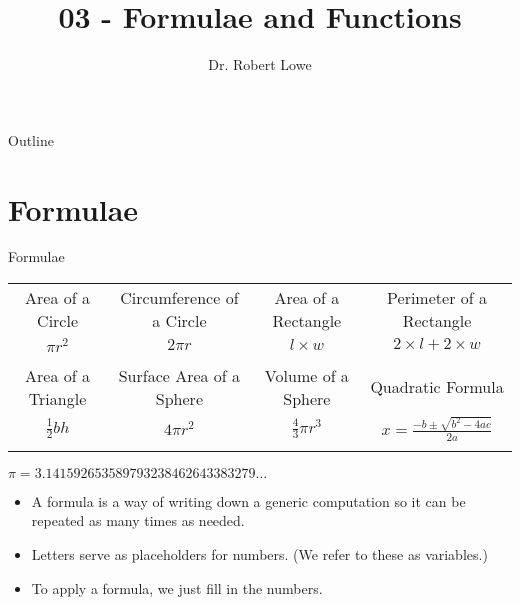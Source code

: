 \documentclass{beamer}
\title{03 - Formulae and Functions}
\author{Dr. Robert Lowe\\}
\institute[Maryville College] %
{
  Division of Mathematics and Computer Science\\
  Maryville College
}
\date[]{}
\begin{document}
\begin{frame}
  \titlepage
\end{frame}

\begin{frame}{Outline}
  \tableofcontents
\end{frame}





\section{Formulae}

\begin{frame}{Formulae}
\begin{adjustbox}{max width=0.9\textwidth}
    \begin{tabular}{|c|c|c|c|}
    \hline
    Area of a Circle & Circumference of a Circle & Area of a Rectangle & Perimeter of a Rectangle\\
    $\pi r^2$ & $2\pi r$ & $l \times w$ & $2\times l + 2 \times w$\\
    & & &\\
    \hline
    Area of a Triangle & Surface Area of a Sphere & Volume of a Sphere & Quadratic Formula\\
    $\frac{1}{2}bh$ & $4 \pi r^2$ & $\frac{4}{3} \pi r ^3$ & %
       $x = \displaystyle\frac{-b \pm \sqrt{b^2-4ac}}{2a}$\\
    & & &\\
    \hline
    \end{tabular}
\end{adjustbox}
$\pi=3.141592653589793238462643383279\ldots$

\begin{itemize}[<+->]
\item A formula is a way of writing down a generic computation so it
    can be repeated as many times as needed.
\item Letters serve as placeholders for numbers.  (We refer to these
    as variables.)
\item To apply a formula, we just fill in the numbers.
\end{itemize}
\end{frame}
\end{document}
